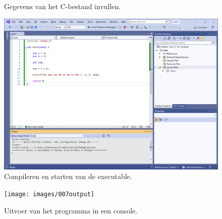 \begin{figure}[H]
\centering
{}
\caption{Gegevens van het C-bestand invullen.}
\label{fig:105enterfilename}
\end{figure}



\begin{figure}[H]
\centering
\includegraphics[scale=0.5]{images/106build}
\caption{Compileren en starten van de executable.}
\label{fig:106build}
\end{figure}

\begin{figure}[H]
\centering
\texttt{[image: images/007output]}
\caption{Uitvoer van het programma in een console.}
\label{fig:007output}
\end{figure}